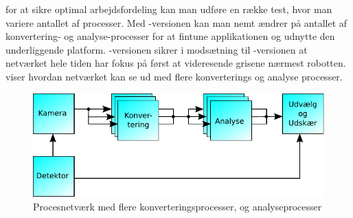 for at sikre optimal arbejdsfordeling kan man udføre en række test, hvor man variere  antallet af processer. Med -versionen kan man nemt ændrer på antallet af konvertering- og analyse-processer for at fintune applikationen og  udnytte den underliggende platform. -versionen sikrer i modsætning til -versionen at netværket hele tiden har fokus på først at videresende grisene nærmest robotten.  viser hvordan netværket kan se ud med flere konverterings og analyse processer. 

\begin{figure}
 \begin{center}
  \includegraphics[scale=1]{images/pig-network3}
	\caption{Procesnetværk med flere konverteringsprocesser, og analyseprocesser}
	\label{fig:pig-network3}
\end{center}
\end{figure}
